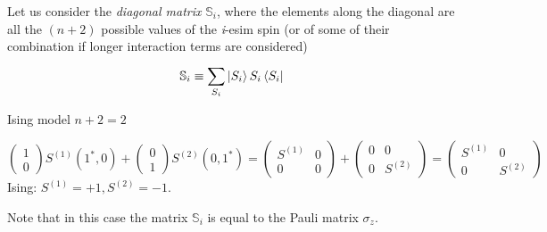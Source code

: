 \documentclass[../../Main/Main.tex]{subfiles}
\begin{document}
Let us consider  the \emph{diagonal matrix} \( \mathbb{S}_i \), where the elements along the diagonal are all the  \( (n+2) \) possible values of the \emph{i}-esim spin (or of some of their combination if longer interaction terms are considered)
\begin{equation}
  \mathbb{S}_i \equiv  \sum_{S_i}^{} \ket{S_i} S_i \bra{S_i}
\end{equation}
\begin{example}{Ising model \( n+2=2 \)}{}

\begin{equation*}
  \begin{pmatrix}
  1 \\
  0
  \end{pmatrix} S^{(1)} (1^*,0) +
  \begin{pmatrix}
  0 \\
  1
  \end{pmatrix} S^{(2)} (0,1^*) =
  \begin{pmatrix}
  S^{(1)}   & 0 \\
  0   & 0
  \end{pmatrix}
  +
  \begin{pmatrix}
  0   & 0 \\
  0   & S^{(2)}
  \end{pmatrix}
  =
  \begin{pmatrix}
  S^{(1)}  & 0 \\
  0   & S^{(2)}
  \end{pmatrix}
\end{equation*}
Ising: \( S^{(1)} =+1,S^{(2)}=-1 \).






\begin{remark}
Note that in this case the matrix \( \mathbb{S}_i \) is equal to the Pauli matrix \( \sigma _z \).
\end{remark}
\end{example}
\end{document}
